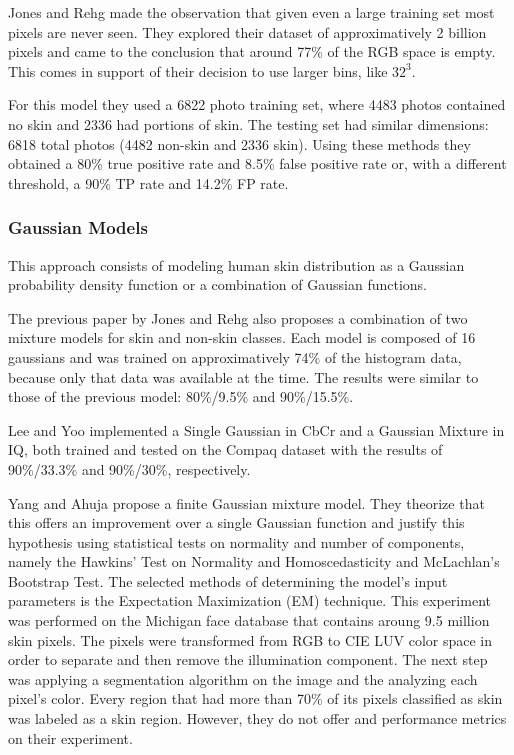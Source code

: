 \documentclass[12pt]{report}
\begin{document}
	Jones and Rehg\cite{compaq} made the observation that given even a large training set most pixels are never seen. They explored their dataset of approximatively 2 billion pixels and came to the conclusion that around 77\% of the RGB space is empty. This comes in support of their decision to use larger bins, like \(32^3\).
	
	For this model they used a 6822 photo training set, where 4483 photos contained no skin and 2336 had portions of skin. The testing set had similar dimensions: 6818 total photos (4482 non-skin and 2336 skin). Using these methods they obtained a 80\% true positive rate and 8.5\% false positive rate or, with a different threshold, a 90\% TP rate and 14.2\% FP rate.
	
	\subsubsection{Gaussian Models}
	This approach consists of modeling human skin distribution as a Gaussian probability density function or a combination of Gaussian functions.
	
	The previous paper\cite{compaq} by Jones and Rehg also proposes a combination of two mixture models for skin and non-skin classes. Each model is composed of 16 gaussians and was trained on approximatively 74\% of the histogram data, because only that data was available at the time. The results were similar to those of the previous model: 80\%/9.5\% and 90\%/15.5\%.
	
	Lee and Yoo\cite{gaussian_applied} implemented a Single Gaussian in CbCr and a Gaussian Mixture in IQ, both trained and tested on the Compaq dataset with the results of 90\%/33.3\% and 90\%/30\%, respectively.
	
	Yang and Ahuja\cite{Yang99gaussianmixture} propose a finite Gaussian mixture model. They theorize that this offers an improvement over a single Gaussian function and justify this hypothesis using statistical tests on normality and number of components, namely the Hawkins' Test on Normality and Homoscedasticity and McLachlan's Bootstrap Test. The selected methods of determining the model's input parameters is the Expectation Maximization (EM) technique. This experiment was performed on the Michigan face database that contains aroung 9.5 million skin pixels. The pixels were transformed from RGB to CIE LUV color space in order to separate and then remove the illumination component. The next step was applying a segmentation algorithm on the image and the analyzing each pixel's color. Every region that had more than 70\% of its pixels classified as skin was labeled as a skin region. However, they do not offer and performance metrics on their experiment.
	
\end{document}

